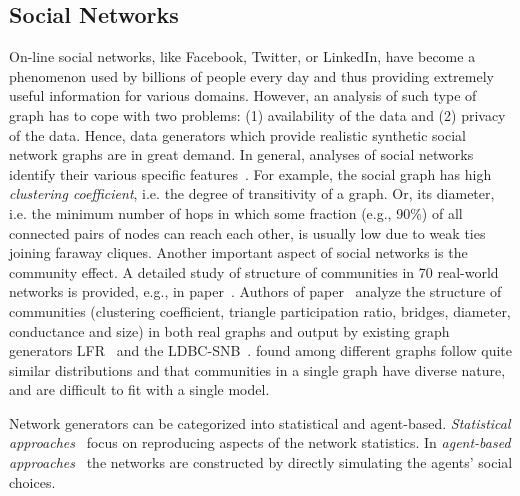 \subsection{Social Networks}
\label{sec:generators_socialnetworks}

On-line social networks, like Facebook, Twitter, or LinkedIn, have become a
phenomenon used by billions of people every day and thus providing extremely
useful information for various domains. However, an analysis of such type of
graph has to cope with two problems: (1) availability of the data and (2)
privacy of the data. Hence, data generators which provide realistic synthetic
social network graphs are in great demand. In general, analyses of social networks identify their various specific
features~\cite{Chakrabarti:2006:GML:1132952.1132954}. For example, the social
graph has high \emph{clustering coefficient}, i.e. the degree of transitivity of
a graph. Or, its diameter, i.e. the minimum number of hops in which some
fraction (e.g., 90\%) of all connected pairs of nodes can reach each other, is
usually low due to weak ties joining faraway cliques. Another important aspect
of social networks is the community effect. A detailed study of structure of
communities in 70 real-world networks is provided, e.g., in
paper~\cite{Leskovec:2008:SPC:1367497.1367591}. Authors of
paper~\cite{Prat-Perez:2014:CSS:2621934.2621942} analyze the structure of
communities (clustering coefficient, triangle participation ratio, bridges,
diameter, conductance and size) in both real graphs and output by existing graph
generators LFR~\cite{PhysRevE.78.046110} and the
LDBC-SNB~\cite{Erling:2015:LSN:2723372.2742786}. %
found among different graphs follow quite similar distributions and that
communities in a single graph have diverse nature, and are difficult to fit with
a single model.

Network generators can be categorized into statistical and agent-based.
\emph{Statistical
approaches}~\cite{PhysRevE.78.046110,Yao2011,Armstrong:2013:LDB:2463676.2465296,Pham2013,Sukthankar-SocialInfo2014,Erling:2015:LSN:2723372.2742786,Nettleton2016}
focus on reproducing aspects of the network statistics. In \emph{agent-based
approaches}~\cite{Barrett:2009:GAL:1995456.1995598,Bernstein:2013:SAS:2499604.2499609}
the networks are constructed by directly simulating the agents' social choices.

